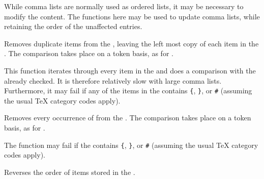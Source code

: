 \documentclass[oneside]{book}
\begin{document}
While comma lists are normally used as ordered lists, it may be
necessary to modify the content. The functions here may be used
to update comma lists, while retaining the order of the unaffected
entries.
 
\begin{function}{\ClistVarRemoveDuplicates}
\begin{syntax}
 
\end{syntax}
Removes duplicate items from the , leaving the
left most copy of each item in the .  The 
comparison takes place on a token basis, as for .
\begin{texnote}
This function iterates through every item in the  and
does a comparison with the  already checked. It is therefore
relatively slow with large comma lists.
Furthermore, it may fail if any of the items in the
 contains \verb|{|, \verb|}|, or \verb|#|
(assuming the usual \TeX{} category codes apply).
\end{texnote}
\end{function}
 
\begin{function}{\ClistVarRemoveAll}
\begin{syntax}
  
\end{syntax}
Removes every occurrence of  from the .
The  comparison takes place on a token basis, as for
.
\begin{texnote}
The function may fail if the  contains \verb|{|, \verb|}|, or \verb|#|
(assuming the usual \TeX{} category codes apply).
\end{texnote}
\end{function}
 
\begin{function}{\ClistVarReverse}
\begin{syntax}
 
\end{syntax}
Reverses the order of items stored in the .
\end{function}
 
\end{document}
